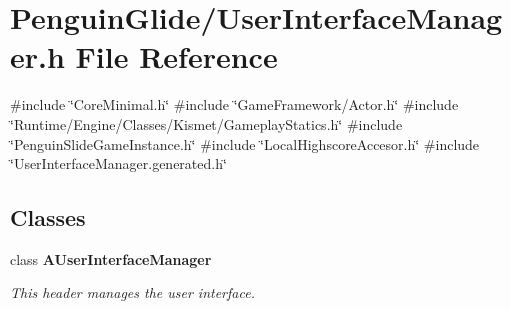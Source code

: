 \section{Penguin\+Glide/\+User\+Interface\+Manager.h File Reference}
\label{_user_interface_manager_8h}
{\ttfamily \#include \char`\"{}Core\+Minimal.\+h\char`\"{}}\newline
{\ttfamily \#include \char`\"{}Game\+Framework/\+Actor.\+h\char`\"{}}\newline
{\ttfamily \#include \char`\"{}Runtime/\+Engine/\+Classes/\+Kismet/\+Gameplay\+Statics.\+h\char`\"{}}\newline
{\ttfamily \#include \char`\"{}Penguin\+Slide\+Game\+Instance.\+h\char`\"{}}\newline
{\ttfamily \#include \char`\"{}Local\+Highscore\+Accesor.\+h\char`\"{}}\newline
{\ttfamily \#include \char`\"{}User\+Interface\+Manager.\+generated.\+h\char`\"{}}\newline
\subsection*{Classes}
\begin{DoxyCompactItemize}
\item 
class \textbf{ A\+User\+Interface\+Manager}
\begin{DoxyCompactList}\small\item\em This header manages the user interface. \end{DoxyCompactList}\end{DoxyCompactItemize}
